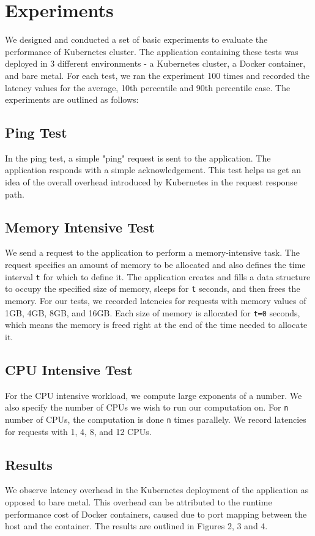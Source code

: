 \documentclass[sigconf]{acmart}
\begin{document}
\section{Experiments}
We designed and conducted a set of basic experiments to evaluate the performance of Kubernetes cluster. The application containing these tests was deployed in 3 different environments - a Kubernetes cluster, a Docker container, and bare metal. For each test, we ran the experiment 100 times and recorded the latency values for the average, 10th percentile and 90th percentile case. The experiments are outlined as follows:

\subsection{Ping Test}
In the ping test, a simple "ping" request is sent to the application. The application responds with a simple acknowledgement. This test helps us get an idea of the overall overhead introduced by Kubernetes in the request response path.

\subsection{Memory Intensive Test}
We send a request to the application to perform a memory-intensive task. The request specifies an amount of memory to be allocated and also defines the time interval \texttt{t} for which to define it. The application creates and fills a data structure to occupy the specified size of memory, sleeps for \texttt{t} seconds, and then frees the memory. For our tests, we recorded latencies for requests with memory values of 1GB, 4GB, 8GB, and 16GB. Each size of memory is allocated for \texttt{t=0} seconds, which means the memory is freed right at the end of the time needed to allocate it. 

\subsection{CPU Intensive Test}
For the CPU intensive workload, we compute large exponents of a number. We also specify the number of CPUs we wish to run our computation on. For \texttt{n} number of CPUs, the computation is done \texttt{n} times parallely. We record latencies for requests with 1, 4, 8, and 12 CPUs.

\subsection{Results}
We observe latency overhead in the Kubernetes deployment of the application as opposed to bare metal. This overhead can be attributed to the runtime performance cost of Docker containers, caused due to port mapping between the host and the container. The results are outlined in Figures 2, 3 and 4.
\end{document}
